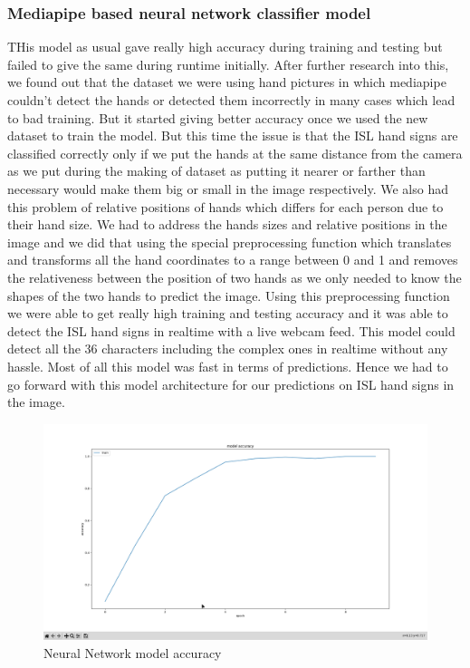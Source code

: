 \documentclass[12pt,a4paper]{report}
\begin{document}
\subsubsection{Mediapipe based neural network classifier model}
THis model as usual gave really high accuracy during training and testing but failed to give the same during runtime initially. After further research into this, we found out that the dataset we were using hand pictures in which mediapipe couldn't detect the hands or detected them incorrectly in many cases which lead to bad training. But it started giving better accuracy once we used the new dataset to train the model. But this time the issue is that the ISL hand signs are classified correctly only if we put the hands at the same distance from the camera as we put during the making of dataset as putting it nearer or farther than necessary would make them big or small in the image respectively. We also had this problem of relative positions of hands which differs for each person due to their hand size. We had to address the hands sizes and relative positions in the image and we did that using the special preprocessing function which translates and transforms all the hand coordinates to a range between 0 and 1 and removes the relativeness between the position of two hands as we only needed to know the shapes of the two hands to predict the image. Using this preprocessing function we were able to get really high training and testing accuracy and it was able to detect the ISL hand signs in realtime with a live webcam feed. This model could detect all the 36 characters including the complex ones in realtime without any hassle. Most of all this model was fast in terms of predictions. Hence we had to go forward with this model architecture for our predictions on ISL hand signs in the image.
\begin{figure}[htbp]
	\centerline{\includegraphics[scale=0.15]{neural_network_accuracy.png}}
	\caption{Neural Network model accuracy}
	\label{Neural_net_accuracy}
\end{figure}
\end{document}
